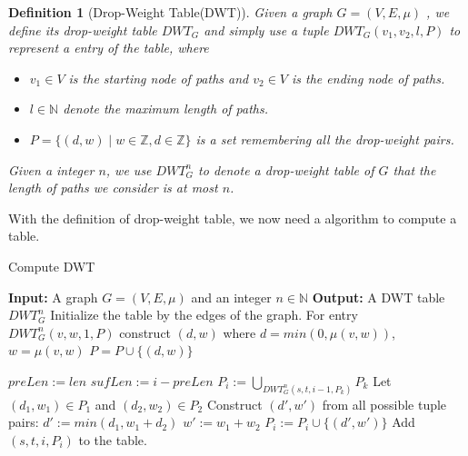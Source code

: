 \documentclass[12pt]{article}
\newtheorem{definition}{Definition}
\begin{document}
\begin{definition}[Drop-Weight Table(DWT)]

Given a graph $G = (V, E, \mu)$ , we define its drop-weight table $DWT_{G}$ and simply use a tuple $DWT_{G}(v_1, v_2, l, P)$ to represent a entry of the table, where

\begin{itemize}
\item $v_1\in V$ is the starting node of  paths and $v_2\in V$ is the ending node of paths.

\item $l\in \mathbb{N}$ denote the maximum length of paths.

\item $P = \{(d,w)\mid w\in \mathbb{Z}, d\in \mathbb{Z}\}$ is a set remembering all the  drop-weight pairs.

\end{itemize}



Given a integer $n$, we use $DWT_{G}^n$ to denote a drop-weight table of $G$ that the length of paths we consider is at most $n$.
\end{definition}


With the definition of drop-weight table, we now need a algorithm to compute a table.

\begin{algorithm}
	\caption{Compute DWT}
	\begin{algorithmic}
		
		\State {}			
		\State \textbf{Input:} A graph $G = (V,E,\mu)$ and an integer $n\in \mathbb{N}$
		\State \textbf{Output:} A DWT table $DWT_G^n$
		\State \Comment Initialize the table by the edges of the graph.
				\State For entry $DWT_G^n(v,w,1,P)$
				\State construct $(d,w)$ where
				\State $d = min(0, \mu(v,w))$, $w = \mu(v,w)$
				\State $P = P \cup \{(d,w)\}$
			\EndFor
		\EndFor
		
		\State
		
				\State $preLen := len$
				\State $sufLen := i - preLen$	
				\State $P_i := \bigcup_{DWT_G^n(s,t,i-1,P_k)} P_k$		
							\State Let $(d_1, w_1)\in P_1$ and $(d_2, w_2)\in P_2$
							\State Construct $(d',w')$ from all possible tuple pairs:
							\State $d' := min(d_1, w_1+d_2)$
							\State $w' := w_1 + w_2$
							\State $P_i := P_i \cup \{(d',w')\}$							
							\EndFor
						\EndFor
						\State Add $(s,t,i,P_i)$ to the table.
					\EndFor
				\EndFor
			\EndFor
		\EndFor
		\EndFunction

	\end{algorithmic}
\end{algorithm}
\end{document}
